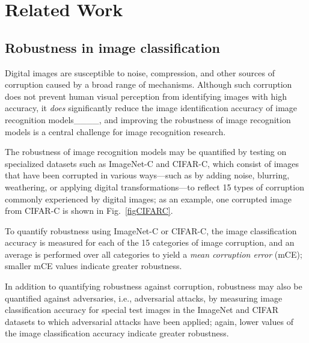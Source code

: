 \section{Related Work}
\label{sec:related}

\subsection{Robustness in image classification}
\label{sec:Robustness}

Digital images are susceptible to noise,
compression, and other sources of corruption
caused by a broad range of mechanisms.
Although such corruption does not prevent
human visual perception from identifying
images with high accuracy, it \textit{does}
significantly reduce the image identification accuracy
of image recognition models____,
and improving the robustness of image recognition models
is a central challenge for image recognition research.

The robustness of image recognition models
may be quantified by testing on specialized
datasets such as ImageNet-C and CIFAR-C, which
consist of images that have been corrupted in various
ways---such as by adding noise, blurring, weathering,
or applying digital transformations---to reflect 15
types of corruption commonly experienced by
digital images; as an example, one corrupted image 
from CIFAR-C is shown in Fig.~\ref{figCIFARC}.

To quantify robustness using ImageNet-C or CIFAR-C,
the image classification accuracy is measured for each of the
15 categories of image corruption, and an average is performed over all
categories to yield a \textit{mean corruption error} (mCE);
smaller mCE values indicate greater robustness.

In addition to quantifying robustness against corruption,
robustness may also be quantified against adversaries, 
i.e., adversarial attacks, by measuring
image classification accuracy for special test images
in the ImageNet and CIFAR datasets to which adversarial
attacks have been applied; again, lower values of the 
image classification accuracy indicate greater robustness.

